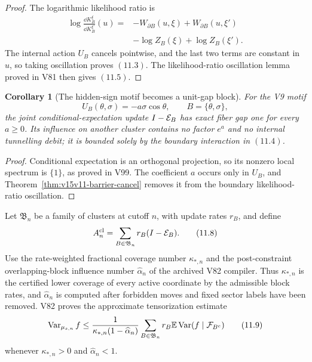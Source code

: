 \documentclass[11pt]{article}
\newtheorem{corollary}[theorem]{Corollary}
\theoremstyle{remark}
\begin{document}
\begin{proof}
The logarithmic likelihood ratio is
\[
 \begin{split}
 \log\frac{\dd K_B^\xi}{\dd K_B^{\xi'}}(u)
 ={}&-W_{\partial B}(u,\xi)
     +W_{\partial B}(u,\xi')\\
 &-\log Z_B(\xi)+\log Z_B(\xi').                            \tag{11.6}
 \end{split}
\]
The internal action \(U_B\) cancels pointwise, and the last two
terms are constant in \(u\), so taking oscillation proves
\((11.3)\).  The likelihood-ratio oscillation lemma proved in V81
then gives \((11.5)\).
\end{proof}

\begin{corollary}[The hidden-sign motif becomes a unit-gap block]
\label{cor:v15v11-sign-cluster}
For the V9 motif
\[
 U_B(\theta,\sigma)=-a\sigma\cos\theta,\qquad
 B=\{\theta,\sigma\},                                       \tag{11.7}
\]
the joint conditional-expectation update \(I-{\cal E}_B\) has
exact fiber gap one for every \(a\ge0\).  Its influence on another
cluster contains no factor \(e^a\) and no internal tunnelling
debit; it is bounded solely by the boundary interaction in
\((11.4)\).
\end{corollary}

\begin{proof}
Conditional expectation is an orthogonal projection, so its
nonzero local spectrum is \(\{1\}\), as proved in V99.  The
coefficient \(a\) occurs only in \(U_B\), and
Theorem~\ref{thm:v15v11-barrier-cancel} removes it from the
boundary likelihood-ratio oscillation.
\end{proof}

Let \({\mathfrak B}_n\) be a family of clusters at cutoff \(n\),
with update rates \(r_B\), and define
\[
 A_n^{\rm cl}
 =\sum_{B\in{\mathfrak B}_n}r_B(I-{\cal E}_B).               \tag{11.8}
\]
Use the rate-weighted fractional coverage number
\(\kappa_{*,n}\) and the post-constraint overlapping-block
influence number \(\widehat\alpha_n\) of the archived V82
compiler.  Thus \(\kappa_{*,n}\) is the certified lower coverage
of every active coordinate by the admissible block rates, and
\(\widehat\alpha_n\) is computed after forbidden moves and fixed
sector labels have been removed.  V82 proves the approximate
tensorization estimate
\[
 \operatorname{Var}_{\mu_{s,n}}f
 \le
 \frac{1}{\kappa_{*,n}(1-\widehat\alpha_n)}
 \sum_{B\in{\mathfrak B}_n}r_B
 \mathbb E\operatorname{Var}
 (f\mid{\cal F}_{B^c})                                      \tag{11.9}
\]
whenever \(\kappa_{*,n}>0\) and
\(\widehat\alpha_n<1\).
\end{document}
